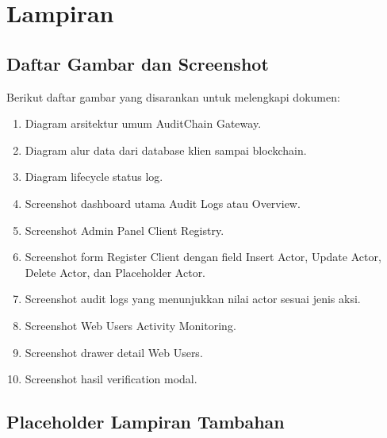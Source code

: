 \chapter{Lampiran}

\section{Daftar Gambar dan Screenshot}

Berikut daftar gambar yang disarankan untuk melengkapi dokumen:

\begin{enumerate}
    \item Diagram arsitektur umum AuditChain Gateway.
    \item Diagram alur data dari database klien sampai blockchain.
    \item Diagram lifecycle status log.
    \item Screenshot dashboard utama Audit Logs atau Overview.
    \item Screenshot Admin Panel Client Registry.
    \item Screenshot form Register Client dengan field Insert Actor, Update Actor, Delete Actor, dan Placeholder Actor.
    \item Screenshot audit logs yang menunjukkan nilai actor sesuai jenis aksi.
    \item Screenshot Web Users Activity Monitoring.
    \item Screenshot drawer detail Web Users.
    \item Screenshot hasil verification modal.
\end{enumerate}

\section{Placeholder Lampiran Tambahan}

